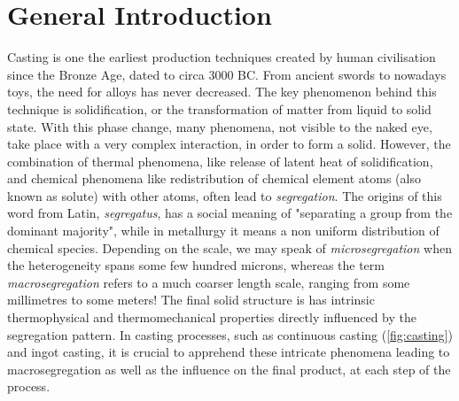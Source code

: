 \chapter{General Introduction}
Casting is one the earliest production techniques created by human civilisation since the Bronze Age, dated to circa 3000 BC. 
From ancient swords to nowadays toys, the need for alloys has never decreased.
The key phenomenon behind this technique is solidification, or the transformation of matter from liquid to solid state. With this phase change, 
many phenomena, not visible to the naked eye, take place with a very complex interaction, in order to form a solid. 
However, the combination of thermal phenomena, like release of latent heat of solidification, and chemical phenomena like redistribution of chemical
element atoms (also known as solute) with other atoms, often lead to \emph{segregation}. The origins of this
word from Latin, \emph{segregatus}, has a social meaning of "separating a group from the dominant majority", while 
in metallurgy it means a non uniform distribution of chemical species. Depending on the scale, we may speak of \emph{microsegregation}
when the heterogeneity spans some few hundred microns, whereas the term \emph{macrosegregation} refers to a much coarser length scale, ranging
from some millimetres to some meters! The final solid structure is has intrinsic thermophysical and thermomechanical properties directly influenced by the segregation pattern. 
In casting processes, such as continuous casting (\cref{fig:casting}) and ingot casting, it is crucial to apprehend 
these intricate phenomena leading to macrosegregation as well as the influence on the final product, at each step of the process. 

